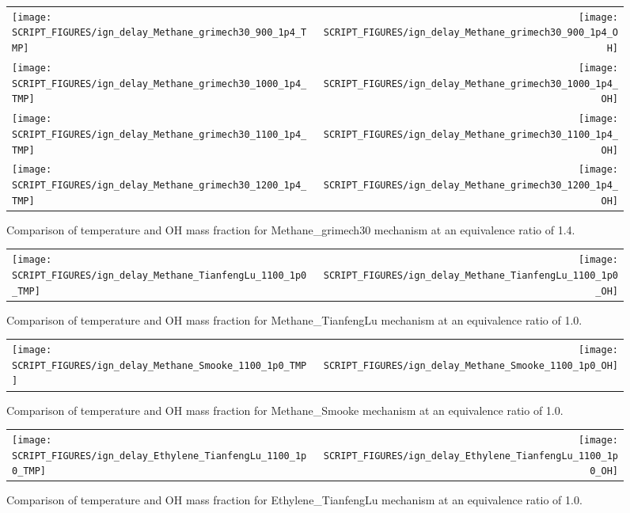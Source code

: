 \documentclass[11pt]{book}
\begin{document}
\begin{figure}[p]
\begin{tabular*}{\textwidth}{lr}
\texttt{[image: SCRIPT\_FIGURES/ign\_delay\_Methane\_grimech30\_900\_1p4\_TMP]} &
\texttt{[image: SCRIPT\_FIGURES/ign\_delay\_Methane\_grimech30\_900\_1p4\_OH]} \\
\texttt{[image: SCRIPT\_FIGURES/ign\_delay\_Methane\_grimech30\_1000\_1p4\_TMP]} &
\texttt{[image: SCRIPT\_FIGURES/ign\_delay\_Methane\_grimech30\_1000\_1p4\_OH]} \\
\texttt{[image: SCRIPT\_FIGURES/ign\_delay\_Methane\_grimech30\_1100\_1p4\_TMP]} &
\texttt{[image: SCRIPT\_FIGURES/ign\_delay\_Methane\_grimech30\_1100\_1p4\_OH]} \\
\texttt{[image: SCRIPT\_FIGURES/ign\_delay\_Methane\_grimech30\_1200\_1p4\_TMP]} &
\texttt{[image: SCRIPT\_FIGURES/ign\_delay\_Methane\_grimech30\_1200\_1p4\_OH]}
\end{tabular*}
\caption[Results of the {\ct ignition\_delay} test cases]{Comparison of temperature and OH mass fraction for Methane\_grimech30 mechanism at an equivalence ratio of 1.4.}
\label{fig:ign_delay_Methane_grimech30_phi_1.4}
\end{figure}


\begin{figure}[p]
\begin{tabular*}{\textwidth}{lr}
\texttt{[image: SCRIPT\_FIGURES/ign\_delay\_Methane\_TianfengLu\_1100\_1p0\_TMP]} &
\texttt{[image: SCRIPT\_FIGURES/ign\_delay\_Methane\_TianfengLu\_1100\_1p0\_OH]}
\end{tabular*}
\caption[Results of the {\ct ignition\_delay} test cases]{Comparison of temperature and OH mass fraction for Methane\_TianfengLu mechanism at an equivalence ratio of 1.0.}
\label{fig:ign_delay_Methane_TianfengLu_phi_1.0}
\end{figure}

\begin{figure}[p]
\begin{tabular*}{\textwidth}{lr}
\texttt{[image: SCRIPT\_FIGURES/ign\_delay\_Methane\_Smooke\_1100\_1p0\_TMP]} &
\texttt{[image: SCRIPT\_FIGURES/ign\_delay\_Methane\_Smooke\_1100\_1p0\_OH]}
\end{tabular*}
\caption[Results of the {\ct ignition\_delay} test cases]{Comparison of temperature and OH mass fraction for Methane\_Smooke mechanism at an equivalence ratio of 1.0.}
\label{fig:ign_delay_Methane_Smooke_phi_1.0}
\end{figure}

\begin{figure}[p]
\begin{tabular*}{\textwidth}{lr}
\texttt{[image: SCRIPT\_FIGURES/ign\_delay\_Ethylene\_TianfengLu\_1100\_1p0\_TMP]} &
\texttt{[image: SCRIPT\_FIGURES/ign\_delay\_Ethylene\_TianfengLu\_1100\_1p0\_OH]}
\end{tabular*}
\caption[Results of the {\ct ignition\_delay} test cases]{Comparison of temperature and OH mass fraction for Ethylene\_TianfengLu mechanism at an equivalence ratio of 1.0.}
\label{fig:ign_delay_Ethylene_TianfengLu_phi_1.0}
\end{figure}
\end{document}
